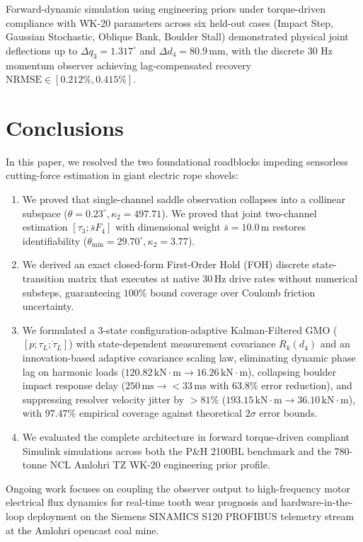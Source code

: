 \documentclass[journal]{IEEEtran}
\begin{document}
Forward-dynamic simulation using engineering priors under torque-driven compliance with WK-20 parameters across six held-out cases (Impact Step, Gaussian Stochastic, Oblique Bank, Boulder Stall) demonstrated physical joint deflections up to $\Delta q_3 = 1.317^\circ$ and $\Delta d_4 = 80.9\,\mathrm{mm}$, with the discrete 30 Hz momentum observer achieving lag-compensated recovery $\mathrm{NRMSE} \in [0.212\%, 0.415\%]$.

\section{Conclusions}
In this paper, we resolved the two foundational roadblocks impeding sensorless cutting-force estimation in giant electric rope shovels:
\begin{enumerate}
    \item We proved that single-channel saddle observation collapses into a collinear subspace ($\theta = 0.23^\circ, \kappa_2 = 497.71$). We proved that joint two-channel estimation $[\tau_3; \bar{s} F_4]$ with dimensional weight $\bar{s} = 10.0\,\mathrm{m}$ restores identifiability ($\theta_{\min} = 29.70^\circ, \kappa_2 = 3.77$).
    \item We derived an exact closed-form First-Order Hold (FOH) discrete state-transition matrix that executes at native $30\,\mathrm{Hz}$ drive rates without numerical substeps, guaranteeing $100\%$ bound coverage over Coulomb friction uncertainty.
    \item We formulated a 3-state configuration-adaptive Kalman-Filtered GMO ($[p; \tau_L; \dot{\tau}_L]$) with state-dependent measurement covariance $R_k(d_4)$ and an innovation-based adaptive covariance scaling law, eliminating dynamic phase lag on harmonic loads ($120.82\,\mathrm{kN\cdot m} \to 16.26\,\mathrm{kN\cdot m}$), collapsing boulder impact response delay ($250\,\mathrm{ms} \to <33\,\mathrm{ms}$ with $63.8\%$ error reduction), and suppressing resolver velocity jitter by $>81\%$ ($193.15\,\mathrm{kN\cdot m} \to 36.10\,\mathrm{kN\cdot m}$), with $97.47\%$ empirical coverage against theoretical $2\sigma$ error bounds.
    \item We evaluated the complete architecture in forward torque-driven compliant Simulink simulations across both the P\&H 2100BL benchmark and the 780-tonne NCL Amlohri TZ WK-20 engineering prior profile.
\end{enumerate}

Ongoing work focuses on coupling the observer output to high-frequency motor electrical flux dynamics for real-time tooth wear prognosis and hardware-in-the-loop deployment on the Siemens SINAMICS S120 PROFIBUS telemetry stream at the Amlohri opencast coal mine.
\end{document}
